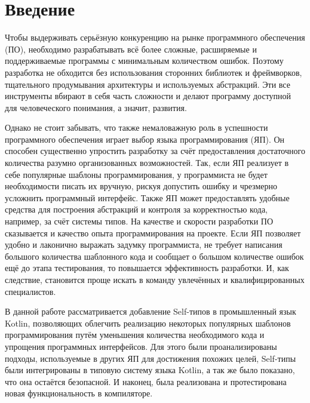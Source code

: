 \section*{Введение}

Чтобы выдерживать серьёзную конкуренцию на рынке программного обеспечения (ПО), необходимо разрабатывать всё более сложные, расширяемые и поддерживаемые программы с минимальным количеством ошибок.
Поэтому разработка не обходится без использования сторонних библиотек и фреймворков, тщательного продумывания архитектуры и используемых абстракций.
Эти все инструменты вбирают в себя часть сложности и делают программу доступной для человеческого понимания, а значит, развития.

Однако не стоит забывать, что также немаловажную роль в успешности программного обеспечения играет выбор языка программирования (ЯП).
Он способен существенно упростить разработку за счёт предоставления достаточного количества разумно организованных возможностей.
Так, если ЯП реализует в себе популярные шаблоны программирования, у программиста не будет необходимости писать их вручную, рискуя допустить ошибку и чрезмерно усложнить программный интерфейс.
Также ЯП может предоставлять удобные средства для построения абстракций и контроля за корректностью кода, например, за счёт системы типов.
На качестве и скорости разработки ПО сказывается и качество опыта программирования на проекте.
Если ЯП позволяет удобно и лаконично выражать задумку программиста, не требует написания большого количества шаблонного кода и сообщает о большом количестве ошибок ещё до этапа тестирования, то повышается эффективность разработки.
И, как следствие, становится проще искать в команду увлечённых и квалифицированных специалистов.

В данной работе рассматривается добавление Self-типов в промышленный язык Kotlin, позволяющих облегчить реализацию некоторых популярных шаблонов программирования путём уменьшения количества необходимого кода и упрощения программных интерфейсов.
Для этого были проанализированы подходы, используемые в других ЯП для достижения похожих целей, Self-типы были интегрированы в типовую систему языка Kotlin, а так же было показано, что она остаётся безопасной.
И наконец, была реализована и протестирована новая функциональность в компиляторе.
